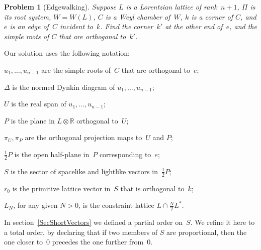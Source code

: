 \documentclass[12pt]{amsart}
\def\R{\mathbb{R}}
\def\tensor{\otimes}
\def\D{\Delta}
\numberwithin{theorem}{section}
\numberwithin{equation}{section}
\numberwithin{figure}{section}
\newtheorem{problem}[theorem]{Problem}
\theoremstyle{remark}
\begin{document}
\begin{problem}[Edgewalking]
    \label{ProbEdgewalking}
    Suppose $L$ is a Lorentzian lattice of rank~$n+1$, 
    $\Pi$ is its root system,
    $W=W(L)$, $C$ is a Weyl chamber of~$W$, $k$ is a corner of $C$,
    and $e$ is an edge of~$C$ incident to~$k$.  
    Find the corner~$k'$ at the other end of~$e$, and the
    simple roots of $C$ that are orthogonal to~$k'$.
\end{problem}

\noindent
Our solution uses the following notation:

$u_1,\dots,u_{n-1}$ are the simple roots of~$C$ that are orthogonal to~$e$;

$\D$ is the normed Dynkin diagram of $u_1,\dots,u_{n-1}$;

$U$ is the real span of $u_1,\dots,u_{n-1}$;

$P$ is the plane in $L\tensor\R$ orthogonal to~$U$;

$\pi_U,\pi_P$ are the orthogonal projection maps to~$U$ and $P$;

$\frac12P$ is the open half-plane in~$P$ corresponding to~$e$;

$S$ is the sector of spacelike and lightlike vectors in~$\frac12P$;

$r_0$ is the primitive lattice vector in~$S$ that is orthogonal to~$k$;

$L_N$, for any given $N>0$, is the constraint lattice $L\cap\frac{N}{2}L^*$.

\noindent
In section~\ref{SecShortVectors} we defined a partial order on~$S$.  We refine it here
to a total order, by declaring that if two members of $S$ are proportional,
then the one closer to~$0$ precedes the one further from~$0$. 
\end{document}
